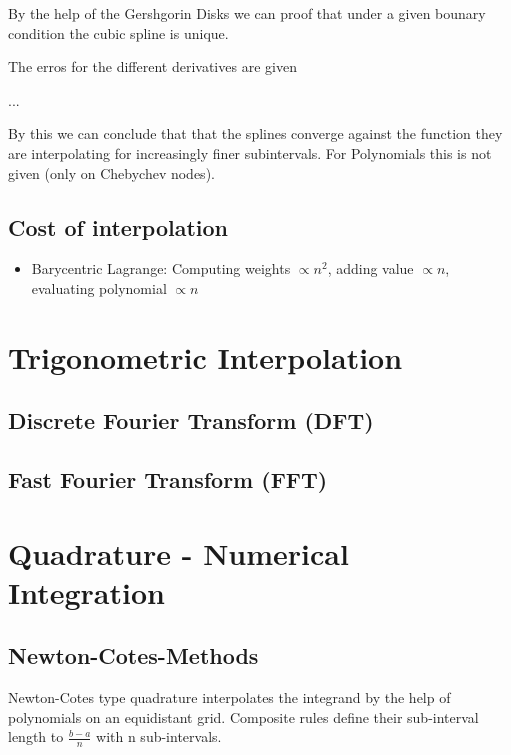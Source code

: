 \documentclass[
    a4paper,
    11pt
]{article}
\begin{document}
By the help of the Gershgorin Disks we can proof that under a given bounary
condition the cubic spline is unique.

The erros for the different derivatives are given

...

By this we can conclude that that the splines converge against the function they
are interpolating for increasingly finer subintervals. For Polynomials this is
not given (only on Chebychev nodes).

\subsection{Cost of interpolation}

\begin{itemize}
    \item Barycentric Lagrange: Computing weights $\propto n^2$, adding value
        $\propto n$, evaluating polynomial $\propto n$
    
\end{itemize}


\section{Trigonometric Interpolation}

\subsection{Discrete Fourier Transform (DFT)}

\subsection{Fast Fourier Transform (FFT)}


\section{Quadrature - Numerical Integration}

\subsection{Newton-Cotes-Methods}

Newton-Cotes type quadrature interpolates the integrand by the help of
polynomials on an equidistant grid. Composite rules define their sub-interval
length to $\frac{b-a}{n}$ with n sub-intervals.
\end{document}
